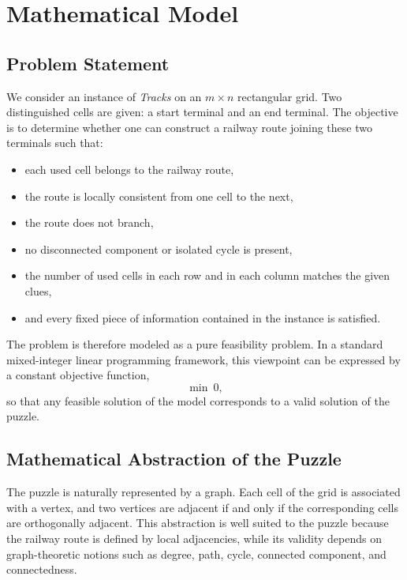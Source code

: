 \section{Mathematical Model}
\label{sec:mathematical-model}

\subsection{Problem Statement}

We consider an instance of \emph{Tracks} on an \(m \times n\) rectangular grid. Two distinguished cells are given: a start terminal and an end terminal. The objective is to determine whether one can construct a railway route joining these two terminals such that:
\begin{itemize}[leftmargin=2em]
    \item each used cell belongs to the railway route,
    \item the route is locally consistent from one cell to the next,
    \item the route does not branch,
    \item no disconnected component or isolated cycle is present,
    \item the number of used cells in each row and in each column matches the given clues,
    \item and every fixed piece of information contained in the instance is satisfied.
\end{itemize}

The problem is therefore modeled as a pure feasibility problem. In a standard mixed-integer linear programming framework, this viewpoint can be expressed by a constant objective function,
\[
    \min \ 0,
\]
so that any feasible solution of the model corresponds to a valid solution of the puzzle.

\subsection{Mathematical Abstraction of the Puzzle}

The puzzle is naturally represented by a graph. Each cell of the grid is associated with a vertex, and two vertices are adjacent if and only if the corresponding cells are orthogonally adjacent. This abstraction is well suited to the puzzle because the railway route is defined by local adjacencies, while its validity depends on graph-theoretic notions such as degree, path, cycle, connected component, and connectedness.

